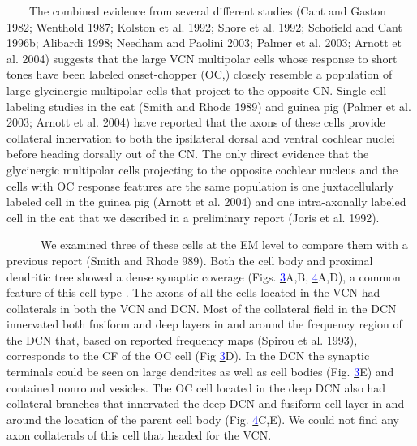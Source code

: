 \documentclass[10pt,a4paper]{article}
\newcommand\textstyleInternetlink[1]{\textcolor{blue}{#1}}
\begin{document}
\citep{SmithMassieEtAl:2005} \ \ \ \ The combined evidence from several
different studies (Cant and Gaston 1982; Wenthold 1987; Kolston et al. 1992;
Shore et al. 1992; Schofield and Cant 1996b; Alibardi 1998; Needham and Paolini
2003; Palmer et al. 2003; Arnott et al. 2004) suggests that the large VCN
multipolar cells whose response to short tones have been labeled onset-chopper
(OC,\citep{RhodeOertelEtAl:1983a,SmithRhode:1989}) closely resemble a population
of large glycinergic multipolar cells that project to the opposite
CN. Single-cell labeling studies in the cat (Smith and Rhode 1989) and guinea
pig (Palmer et al. 2003; Arnott et al. 2004) have reported that the axons of
these cells provide collateral innervation to both the ipsilateral dorsal and
ventral cochlear nuclei before heading dorsally out of the CN. The only direct
evidence that the glycinergic multipolar cells projecting to the opposite
cochlear nucleus and the cells with OC response features are the same population
is one juxtacellularly labeled cell in the guinea pig (Arnott et al. 2004) and
one intra-axonally labeled cell in the cat that we described in a preliminary
report (Joris et al. 1992).

\ \ \ \ \ \ We examined three of these cells at the EM level to compare them
with a previous report (Smith and Rhode 989).  Both the cell body and proximal
dendritic tree showed a dense synaptic coverage (Figs.
\href{www3.interscience.wiley.com.mate.lib.unimelb.edu.au/cgi-bin/fulltext/109873297/main.html,ftx_abs#FIG3}{\textstyleInternetlink{3}}A,B,
\href{www3.interscience.wiley.com.mate.lib.unimelb.edu.au/cgi-bin/fulltext/109873297/main.html,ftx_abs#FIG4}{\textstyleInternetlink{4}}A,D),
a common feature of this cell type \citep{SmithRhode:1989}.  The axons of all
the cells located in the VCN had collaterals in both the VCN and DCN. Most of
the collateral field in the DCN innervated both fusiform and deep layers in and
around the frequency region of the DCN that, based on reported frequency maps
(Spirou et al. 1993), corresponds to the CF of the OC cell (Fig
\href{www3.interscience.wiley.com.mate.lib.unimelb.edu.au/cgi-bin/fulltext/109873297/main.html,ftx_abs#FIG3}{\textstyleInternetlink{3}}D).
In the DCN the synaptic terminals could be seen on large dendrites as well as
cell bodies
(Fig. \href{www3.interscience.wiley.com.mate.lib.unimelb.edu.au/cgi-bin/fulltext/109873297/main.html,ftx_abs#FIG3}{\textstyleInternetlink{3}}E)
and contained nonround vesicles. The OC cell located in the deep DCN also had
collateral branches that innervated the deep DCN and fusiform cell layer in and
around the location of the parent cell body
(Fig. \href{www3.interscience.wiley.com.mate.lib.unimelb.edu.au/cgi-bin/fulltext/109873297/main.html,ftx_abs#FIG4}{\textstyleInternetlink{4}}C,E).
We could not find any axon collaterals of this cell that headed for the VCN.
\end{document}
